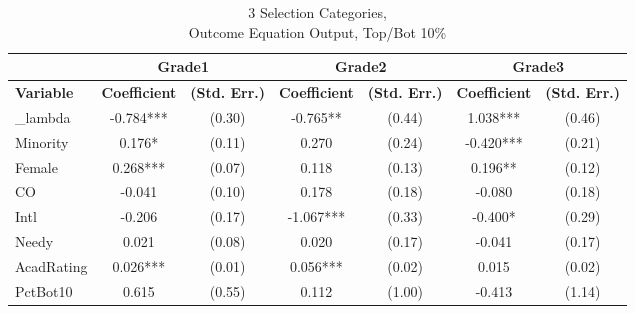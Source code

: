 \begin{sidewaystable}[htb]\centering
  \begin{threeparttable}
    \caption{3 Selection Categories, \\Outcome Equation Output, Top/Bot 10\%}\label{table:b7}
    \begin{tabular}{l|c|c|c|c|c|c}
      \hline\hline 
                        & \multicolumn{2}{|c|}{Grade1} & \multicolumn{2}{|c|}{Grade2} & \multicolumn{2}{|c}{Grade3}                                                               \\
      \hline
      \textbf{Variable} & \textbf{Coefficient}         & \textbf{(Std. Err.)}         & \textbf{Coefficient} & \textbf{(Std. Err.)} & \textbf{Coefficient} & \textbf{(Std. Err.)} \\ 
      \hline
      \hline                                                                                                                                                     
      \_lambda          & -0.784***                    & (0.30)                       & -0.765**             & (0.44)               & 1.038***             & (0.46)               \\
      Minority          & 0.176*                       & (0.11)                       & 0.270                & (0.24)               & -0.420***            & (0.21)               \\
      Female            & 0.268***                     & (0.07)                       & 0.118                & (0.13)               & 0.196**              & (0.12)               \\
      CO                & -0.041                       & (0.10)                       & 0.178                & (0.18)               & -0.080               & (0.18)               \\
      Intl              & -0.206                       & (0.17)                       & -1.067***            & (0.33)               & -0.400*              & (0.29)               \\
      Needy             & 0.021                        & (0.08)                       & 0.020                & (0.17)               & -0.041               & (0.17)               \\
      AcadRating        & 0.026***                     & (0.01)                       & 0.056***             & (0.02)               & 0.015                & (0.02)               \\
      PctBot10          & 0.615                        & (0.55)                       & 0.112                & (1.00)               & -0.413               & (1.14)               \\

\end{tabular}
\end{threeparttable}
\end{sidewaystable}
